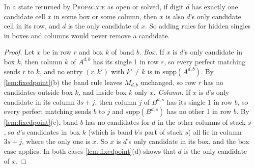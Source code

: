 \begin{proposition}
\label{prop:hidden}
In a state returned by \textsc{Propagate} as open or solved, if digit $d$ has exactly one candidate cell $x$ in some box
or some column, then $x$ is also $d$'s only candidate cell in its row, and $d$ is the only candidate of $x$. So adding
rules for hidden singles in boxes and columns would never remove a candidate.
\end{proposition}
\begin{proof}
Let $x$ be in row $r$ and box $k$ of band $b$. \emph{Box.} If $x$ is $d$'s only candidate in box $k$, then column $k$ of
$A^{d,b}$ has its single 1 in row $r$, so every perfect matching sends $r$ to $k$, and no entry $(r,k')$ with $k'\neq
k$ is in $\mathrm{supp}(A^{d,b})$. By \cref{lem:fixedpoint}(b) the band rule leaves $M_{d,b}$ unchanged, so row $r$ has
no candidates outside box $k$, and inside box $k$ only $x$. \emph{Column.} If $x$ is $d$'s only candidate in its column
$3s+j$, then column $j$ of $B^{d,s}$ has its single 1 in row $b$, so every perfect matching sends $b$ to $j$ and
$\mathrm{supp}(B^{d,s})$ has no other 1 in row $b$. By \cref{lem:fixedpoint}(c), band $b$ has no candidates for $d$ in
the other columns of stack $s$, so $d$'s candidates in box $k$ (which is band $b$'s part of stack $s$) all lie in column
$3s+j$, where the only one is $x$. So $x$ is $d$'s only candidate in its box, and the box case applies. In both cases
\cref{lem:fixedpoint}(d) shows that $d$ is the only candidate of $x$.
\end{proof}

